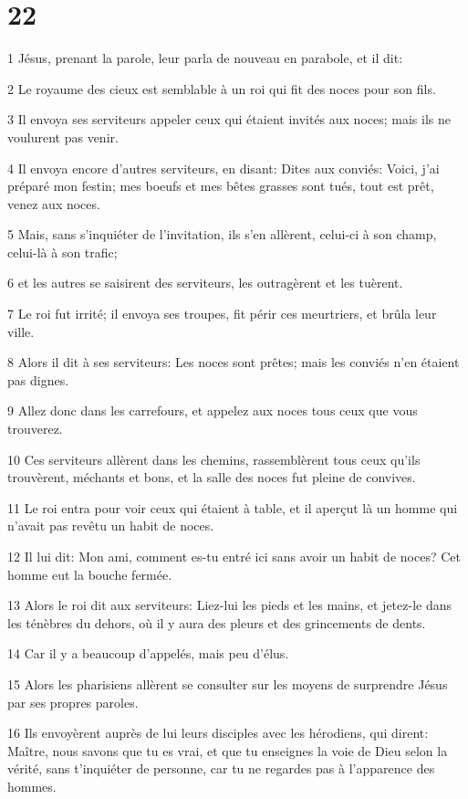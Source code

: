 \chapter{22}

\par 1 Jésus, prenant la parole, leur parla de nouveau en parabole, et il dit:
\par 2 Le royaume des cieux est semblable à un roi qui fit des noces pour son fils.
\par 3 Il envoya ses serviteurs appeler ceux qui étaient invités aux noces; mais ils ne voulurent pas venir.
\par 4 Il envoya encore d'autres serviteurs, en disant: Dites aux conviés: Voici, j'ai préparé mon festin; mes boeufs et mes bêtes grasses sont tués, tout est prêt, venez aux noces.
\par 5 Mais, sans s'inquiéter de l'invitation, ils s'en allèrent, celui-ci à son champ, celui-là à son trafic;
\par 6 et les autres se saisirent des serviteurs, les outragèrent et les tuèrent.
\par 7 Le roi fut irrité; il envoya ses troupes, fit périr ces meurtriers, et brûla leur ville.
\par 8 Alors il dit à ses serviteurs: Les noces sont prêtes; mais les conviés n'en étaient pas dignes.
\par 9 Allez donc dans les carrefours, et appelez aux noces tous ceux que vous trouverez.
\par 10 Ces serviteurs allèrent dans les chemins, rassemblèrent tous ceux qu'ils trouvèrent, méchants et bons, et la salle des noces fut pleine de convives.
\par 11 Le roi entra pour voir ceux qui étaient à table, et il aperçut là un homme qui n'avait pas revêtu un habit de noces.
\par 12 Il lui dit: Mon ami, comment es-tu entré ici sans avoir un habit de noces? Cet homme eut la bouche fermée.
\par 13 Alors le roi dit aux serviteurs: Liez-lui les pieds et les mains, et jetez-le dans les ténèbres du dehors, où il y aura des pleurs et des grincements de dents.
\par 14 Car il y a beaucoup d'appelés, mais peu d'élus.
\par 15 Alors les pharisiens allèrent se consulter sur les moyens de surprendre Jésus par ses propres paroles.
\par 16 Ils envoyèrent auprès de lui leurs disciples avec les hérodiens, qui dirent: Maître, nous savons que tu es vrai, et que tu enseignes la voie de Dieu selon la vérité, sans t'inquiéter de personne, car tu ne regardes pas à l'apparence des hommes.
